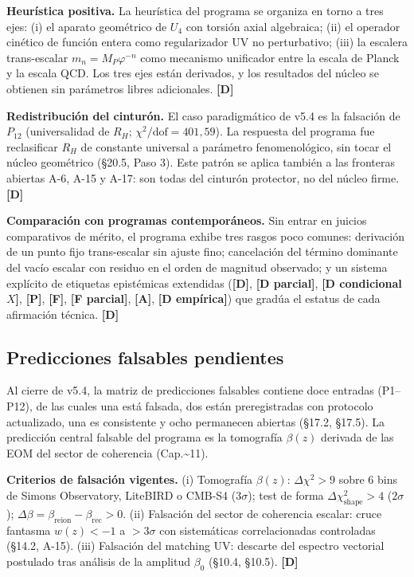 ﻿\documentclass[11pt,letterpaper]{article}
\begin{document}
\textbf{Heurística positiva.} La heurística del programa se organiza en torno a tres ejes: (i) el aparato geométrico de $U_4$ con torsión axial algebraica; (ii) el operador cinético de función entera como regularizador UV no perturbativo; (iii) la escalera trans-escalar $m_n = M_P \varphi^{-n}$ como mecanismo unificador entre la escala de Planck y la escala QCD. Los tres ejes están derivados, y los resultados del núcleo se obtienen sin parámetros libres adicionales. \textbf{[D]}

\textbf{Redistribución del cinturón.} El caso paradigmático de v5.4 es la falsación de $P_{12}$ (universalidad de $R_H$; $\chi^2/\text{dof} = 401{,}59$). La respuesta del programa fue reclasificar $R_H$ de constante universal a parámetro fenomenológico, sin tocar el núcleo geométrico (§20.5, Paso 3). Este patrón se aplica también a las fronteras abiertas A-6, A-15 y A-17: son todas del cinturón protector, no del núcleo firme. \textbf{[D]}

\textbf{Comparación con programas contemporáneos.} Sin entrar en juicios comparativos de mérito, el programa exhibe tres rasgos poco comunes: derivación de un punto fijo trans-escalar sin ajuste fino; cancelación del término dominante del vacío escalar con residuo en el orden de magnitud observado; y un sistema explícito de etiquetas epistémicas extendidas (\textbf{[D]}, \textbf{[D parcial]}, \textbf{[D condicional $X$]}, \textbf{[P]}, \textbf{[F]}, \textbf{[F parcial]}, \textbf{[A]}, \textbf{[D empírica]}) que gradúa el estatus de cada afirmación técnica. \textbf{[D]}
\subsection{Predicciones falsables pendientes}
Al cierre de v5.4, la matriz de predicciones falsables contiene doce entradas (P1--P12), de las cuales una está falsada, dos están preregistradas con protocolo actualizado, una es consistente y ocho permanecen abiertas (§17.2, §17.5). La predicción central falsable del programa es la tomografía $\beta(z)$ derivada de las EOM del sector de coherencia (Cap.\textasciitilde{}11).

\textbf{Criterios de falsación vigentes.} (i) Tomografía $\beta(z)$: $\Delta \chi^2 > 9$ sobre 6 bins de Simons Observatory, LiteBIRD o CMB-S4 ($3\sigma$); test de forma $\Delta \chi^2_{\text{shape}} > 4$ ($2\sigma$); $\Delta\beta = \beta_{\text{reion}} - \beta_{\text{rec}} > 0$. (ii) Falsación del sector de coherencia escalar: cruce fantasma $w(z) < -1$ a $> 3\sigma$ con sistemáticas correlacionadas controladas (§14.2, A-15). (iii) Falsación del matching UV: descarte del espectro vectorial postulado tras análisis de la amplitud $\beta_0$ (§10.4, §10.5). \textbf{[D]}
\end{document}
